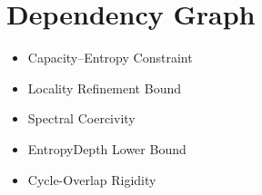 \chapter{Dependency Graph}

\begin{itemize}
\item Capacity--Entropy Constraint
\item Locality Refinement Bound
\item Spectral Coercivity
\item EntropyDepth Lower Bound
\item Cycle-Overlap Rigidity
\end{itemize}

